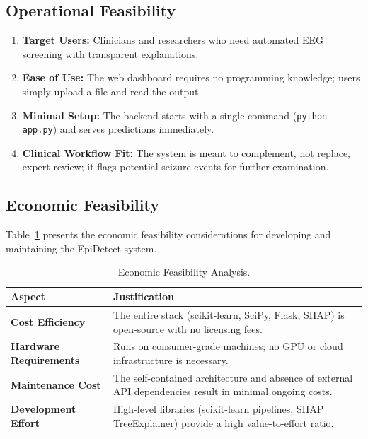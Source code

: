 \subsection{Operational Feasibility}
\begin{enumerate}
    \item \textbf{Target Users:} Clinicians and researchers who need automated EEG screening with transparent explanations.
    \item \textbf{Ease of Use:} The web dashboard requires no programming knowledge; users simply upload a file and read the output.
    \item \textbf{Minimal Setup:} The backend starts with a single command (\texttt{python app.py}) and serves predictions immediately.
    \item \textbf{Clinical Workflow Fit:} The system is meant to complement, not replace, expert review; it flags potential seizure events for further examination.
\end{enumerate}

\subsection{Economic Feasibility}

Table~\ref{tab:econofeas} presents the economic feasibility considerations for developing and maintaining the EpiDetect system.

\begin{table}[htbp]
\centering
\renewcommand{\arraystretch}{1.25}
\caption{Economic Feasibility Analysis.}
\label{tab:econofeas}
\begin{tabular}{|p{4cm}|p{7.5cm}|}
\hline
\textbf{Aspect} & \textbf{Justification} \\
\hline
\textbf{Cost Efficiency} & The entire stack (scikit-learn, SciPy, Flask, SHAP) is open-source with no licensing fees. \\
\hline
\textbf{Hardware Requirements} & Runs on consumer-grade machines; no GPU or cloud infrastructure is necessary. \\
\hline
\textbf{Maintenance Cost} & The self-contained architecture and absence of external API dependencies result in minimal ongoing costs. \\
\hline
\textbf{Development Effort} & High-level libraries (scikit-learn pipelines, SHAP TreeExplainer) provide a high value-to-effort ratio. \\
\hline
\end{tabular}
\end{table}

